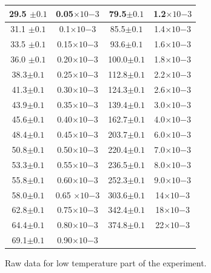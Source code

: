 \documentclass[11pt,a4paper]{article}
\begin{document}
{\begin{center}
\begin{figure} [H]
\begin{tabular}{|c |c||c|c|}
			\hline
			29.5 $\pm0.1$ & 0.05$\times10{-3}$ & 79.5$\pm0.1$ &1.2$\times10{-3}$\\
			\hline
			31.1 $\pm0.1$ & 0.1$\times10{-3}$ &85.5$\pm0.1$ & 1.4$\times10{-3}$\\
			\hline 
			33.5 $\pm0.1$ & 0.15$\times10{-3}$ & 93.6$\pm0.1$ & 1.6$\times10{-3}$\\
			\hline 
			36.0  $\pm0.1$& 0.20$\times10{-3}$ & 100.0$\pm0.1$ &1.8$\times10{-3}$\\
			\hline 
			38.3$\pm0.1$ & 0.25$\times10{-3}$ & 112.8$\pm0.1$ & 2.2$\times10{-3}$\\
			\hline 
			41.3$\pm0.1$ & 0.30$\times10{-3}$ & 124.3$\pm0.1$ & 2.6$\times10{-3}$\\
			\hline 
			43.9$\pm0.1$ & 0.35$\times10{-3}$ & 139.4$\pm0.1$ & 3.0$\times10{-3}$\\
			\hline
			45.6$\pm0.1$ & 0.40$\times10{-3}$ & 162.7$\pm0.1$ & 4.0$\times10{-3}$\\
			\hline
			48.4$\pm0.1$ & 0.45$\times10{-3}$ & 203.7$\pm0.1$ & 6.0$\times10{-3}$\\
			\hline
			50.8$\pm0.1$ & 0.50$\times10{-3}$ & 220.4$\pm0.1$ & 7.0$\times10{-3}$\\
			\hline
			53.3$\pm0.1$ &0.55$\times10{-3}$ & 236.5$\pm0.1$  & 8.0$\times10{-3}$\\
			\hline
			55.8$\pm0.1$ &0.60$\times10{-3}$ & 252.3$\pm0.1$  & 9.0$\times10{-3}$\\
			\hline
			58.0$\pm0.1$ &0.65 $\times10{-3}$ & 303.6$\pm0.1$ & 14$\times10{-3}$\\
			\hline
			62.8$\pm0.1$ &0.75$\times10{-3}$ & 342.4$\pm0.1$  & 18$\times10{-3}$\\
			\hline
			64.4$\pm0.1$ &0.80$\times10{-3}$ & 374.8$\pm0.1$ &  22$\times10{-3}$\\
			\hline
			69.1$\pm0.1$ &0.90$\times10{-3}$ &        &             \\
			\hline
		\end{tabular}
		\caption{Raw data for low temperature part of the experiment.}
	\end{figure}
\begin{figure}[H]
	\begin{center}

\end{center}
\end{figure}
\end{center}}
\end{document}
